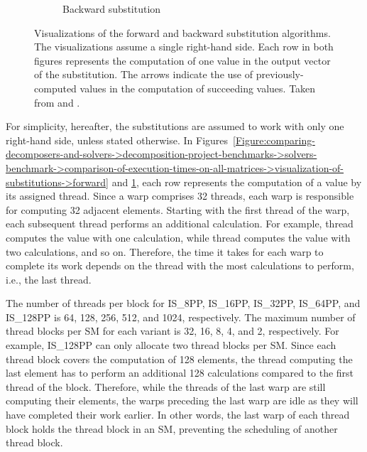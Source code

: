 \begin{figure}[ht!]
\begin{subfigure}[b]{0.48\textwidth}
		\caption{Backward substitution}
		\label{Figure:comparing-decomposers-and-solvers->decomposition-project-benchmarks->solvers-benchmark->comparison-of-execution-times-on-all-matrices->visualization-of-substitutions->backward}
	\end{subfigure}
	\caption{Visualizations of the forward and backward substitution algorithms.
		The visualizations assume a single right-hand side.
		Each row in both figures represents the computation of one value in the output vector of the substitution.
		The arrows indicate the use of previously-computed values in the computation of succeeding values.
		Taken from  \cite{Frolov18July2022} and  \cite{Frolov17July2022}.
	}
	\label{Figure:comparing-decomposers-and-solvers->decomposition-project-benchmarks->solvers-benchmark->comparison-of-execution-times-on-all-matrices->visualization-of-substitutions}
\end{figure}

For simplicity, hereafter, the substitutions are assumed to work with only one right-hand side, unless stated otherwise.
In Figures~\ref{Figure:comparing-decomposers-and-solvers->decomposition-project-benchmarks->solvers-benchmark->comparison-of-execution-times-on-all-matrices->visualization-of-substitutions->forward} and \ref{Figure:comparing-decomposers-and-solvers->decomposition-project-benchmarks->solvers-benchmark->comparison-of-execution-times-on-all-matrices->visualization-of-substitutions->backward}, each row represents the computation of a value by its assigned thread.
Since a warp comprises 32 threads, each warp is responsible for computing 32 adjacent elements.
Starting with the first thread of the warp, each subsequent thread performs an additional calculation.
For example, thread  computes the value with one calculation, while thread  computes the value with two calculations, and so on.
Therefore, the time it takes for each warp to complete its work depends on the thread with the most calculations to perform, i.e., the last thread.

The number of threads per block for IS\_8PP, IS\_16PP, IS\_32PP, IS\_64PP, and IS\_128PP is 64, 128, 256, 512, and 1024, respectively.
The maximum number of thread blocks per SM for each variant is 32, 16, 8, 4, and 2, respectively.
For example, IS\_128PP can only allocate two thread blocks per SM.
Since each thread block covers the computation of 128 elements, the thread computing the last element has to perform an additional 128 calculations compared to the first thread of the block.
Therefore, while the threads of the last warp are still computing their elements, the warps preceding the last warp are idle as they will have completed their work earlier.
In other words, the last warp of each thread block holds the thread block in an SM, preventing the scheduling of another thread block.

